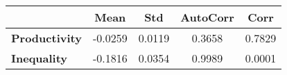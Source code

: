 \begin{tiny}\begin{tabular}{|l|c|c|c|c|}
\hline
&\textbf{Mean}&\textbf{Std}&\textbf{AutoCorr}&\textbf{Corr}\\\hline
\textbf{Productivity}&-0.0259&0.0119&0.3658&0.7829\\\hline
\textbf{Inequality}&-0.1816&0.0354&0.9989&0.0001\\\hline
\end{tabular}
\end{tiny}